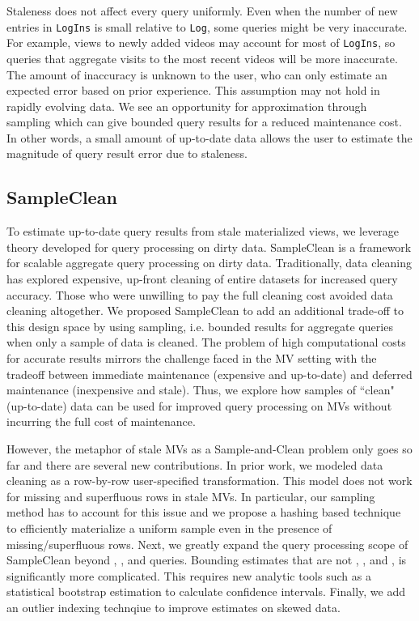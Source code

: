 Staleness does not affect every query uniformly.
Even when the number of new entries in \texttt{LogIns} is small relative to \texttt{Log}, some queries might be very inaccurate.
For example, views to newly added videos may account for most of \texttt{LogIns}, so queries that aggregate visits to the most recent videos will be more inaccurate.
The amount of inaccuracy is unknown to the user, who can only estimate an expected error based on prior experience.
This assumption may not hold in rapidly evolving data.
We see an opportunity for approximation through sampling which can give bounded query results for a reduced maintenance cost.
In other words, a small amount of up-to-date data allows the user to estimate the magnitude of query result error due to staleness.

\subsection{SampleClean~\cite{wang1999sample}}
To estimate up-to-date query results from stale materialized views, we leverage theory developed for query processing on dirty data.
SampleClean is a framework for scalable aggregate query processing on dirty data.
Traditionally, data cleaning has explored expensive, up-front cleaning of entire datasets for increased query accuracy.
Those who were unwilling to pay the full cleaning cost avoided data cleaning altogether.
We proposed SampleClean to add an additional trade-off to this design space by using sampling, i.e. bounded results for aggregate queries when only a sample of data is cleaned.
The problem of high computational costs for accurate results mirrors the challenge faced in the MV setting with the tradeoff between immediate maintenance (expensive and up-to-date) and deferred maintenance (inexpensive and stale). 
Thus, we explore how samples of ``clean" (up-to-date) data can be used for improved query processing on MVs without incurring the full cost of maintenance.

However, the metaphor of stale MVs as a Sample-and-Clean problem only goes so far and there are several new contributions.
In prior work, we modeled data cleaning as a row-by-row user-specified transformation.
This model does not work for missing and superfluous rows in stale MVs.
In particular, our sampling method has to account for this issue and we propose a hashing based technique to efficiently materialize a uniform sample even in the presence of missing/superfluous rows.
Next, we greatly expand the query processing scope of SampleClean beyond \sumfunc, \countfunc, and \avgfunc queries.
Bounding estimates that are not \sumfunc, \countfunc, and \avgfunc, is significantly more complicated.
This requires new analytic tools such as a statistical bootstrap estimation to calculate confidence intervals.
Finally, we add an outlier indexing technqiue to improve estimates on skewed data.


